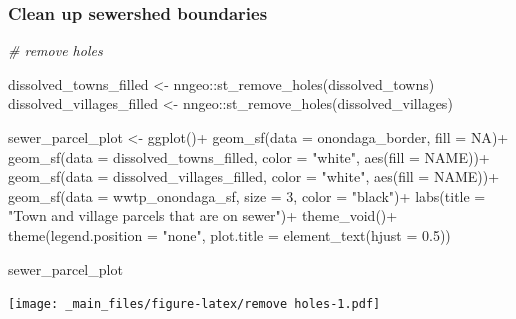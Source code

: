 \documentclass[
]{book}
\newenvironment{Shaded}{\begin{snugshade}}{\end{snugshade}}
\newcommand{\AttributeTok}[1]{\textcolor[rgb]{0.77,0.63,0.00}{#1}}
\newcommand{\CommentTok}[1]{\textcolor[rgb]{0.56,0.35,0.01}{\textit{#1}}}
\newcommand{\ConstantTok}[1]{\textcolor[rgb]{0.00,0.00,0.00}{#1}}
\newcommand{\DecValTok}[1]{\textcolor[rgb]{0.00,0.00,0.81}{#1}}
\newcommand{\FloatTok}[1]{\textcolor[rgb]{0.00,0.00,0.81}{#1}}
\newcommand{\FunctionTok}[1]{\textcolor[rgb]{0.00,0.00,0.00}{#1}}
\newcommand{\NormalTok}[1]{#1}
\newcommand{\OtherTok}[1]{\textcolor[rgb]{0.56,0.35,0.01}{#1}}
\newcommand{\SpecialCharTok}[1]{\textcolor[rgb]{0.00,0.00,0.00}{#1}}
\newcommand{\StringTok}[1]{\textcolor[rgb]{0.31,0.60,0.02}{#1}}
\begin{document}
\hypertarget{clean-up-sewershed-boundaries}{%
\subsubsection{Clean up sewershed boundaries}\label{clean-up-sewershed-boundaries}}

\begin{Shaded}
\begin{Highlighting}[]
\CommentTok{\# remove holes}

\NormalTok{dissolved\_towns\_filled }\OtherTok{\textless{}{-}}\NormalTok{ nngeo}\SpecialCharTok{::}\FunctionTok{st\_remove\_holes}\NormalTok{(dissolved\_towns)}
\NormalTok{dissolved\_villages\_filled }\OtherTok{\textless{}{-}}\NormalTok{ nngeo}\SpecialCharTok{::}\FunctionTok{st\_remove\_holes}\NormalTok{(dissolved\_villages)}

\NormalTok{sewer\_parcel\_plot }\OtherTok{\textless{}{-}} 
  \FunctionTok{ggplot}\NormalTok{()}\SpecialCharTok{+}
  \FunctionTok{geom\_sf}\NormalTok{(}\AttributeTok{data =}\NormalTok{ onondaga\_border, }\AttributeTok{fill =} \ConstantTok{NA}\NormalTok{)}\SpecialCharTok{+}
  \FunctionTok{geom\_sf}\NormalTok{(}\AttributeTok{data =}\NormalTok{ dissolved\_towns\_filled, }\AttributeTok{color =} \StringTok{"white"}\NormalTok{, }\FunctionTok{aes}\NormalTok{(}\AttributeTok{fill =}\NormalTok{ NAME))}\SpecialCharTok{+}
  \FunctionTok{geom\_sf}\NormalTok{(}\AttributeTok{data =}\NormalTok{ dissolved\_villages\_filled, }\AttributeTok{color =} \StringTok{"white"}\NormalTok{, }\FunctionTok{aes}\NormalTok{(}\AttributeTok{fill =}\NormalTok{ NAME))}\SpecialCharTok{+}
  \FunctionTok{geom\_sf}\NormalTok{(}\AttributeTok{data =}\NormalTok{ wwtp\_onondaga\_sf, }\AttributeTok{size =} \DecValTok{3}\NormalTok{, }\AttributeTok{color =} \StringTok{"black"}\NormalTok{)}\SpecialCharTok{+}
  \FunctionTok{labs}\NormalTok{(}\AttributeTok{title =} \StringTok{"Town and village parcels that are on sewer"}\NormalTok{)}\SpecialCharTok{+}
  \FunctionTok{theme\_void}\NormalTok{()}\SpecialCharTok{+}
  \FunctionTok{theme}\NormalTok{(}\AttributeTok{legend.position =} \StringTok{"none"}\NormalTok{,}
        \AttributeTok{plot.title =} \FunctionTok{element\_text}\NormalTok{(}\AttributeTok{hjust =} \FloatTok{0.5}\NormalTok{))}

\NormalTok{sewer\_parcel\_plot}
\end{Highlighting}
\end{Shaded}

\texttt{[image: \_main\_files/figure-latex/remove holes-1.pdf]}
\end{document}
